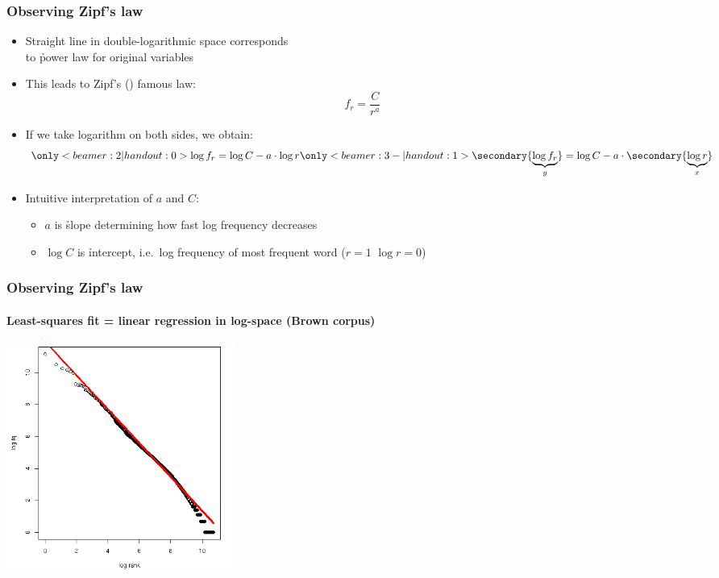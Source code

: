 \documentclass[handout,notes=show,t]{beamer} %
\begin{document}
\begin{frame}
  \frametitle{Observing Zipf's law}

  \begin{itemize}
  \item Straight line in double-logarithmic space corresponds\\
    to \h{power law} for original variables
  \item This leads to Zipf's (\citeyear{Zipf:49,Zipf:65}) famous law:
    \[
      f_r = \frac{C}{r^a}
    \]
  \item<2-> If we take logarithm on both sides, we obtain:
    \[
    \only<beamer:2| handout:0>{%
      \log f_r = \log C - a \cdot \log r}%
    \only<beamer:3-| handout:1>{%
      \secondary{\underbrace{\log f_r}_y}
      = \log C - a \cdot \secondary{\underbrace{\log r}_x}}%
    \]
  \item<4-> Intuitive interpretation of $a$ and $C$:
    \begin{itemize}
    \item $a$ is \h{slope} determining how fast log frequency decreases
    \item $\log C$ is \h{intercept}, i.e.\ log frequency of most frequent word
      ($r = 1$ \so $\log r = 0$) 
    \end{itemize}
  \end{itemize}

\end{frame}

\begin{frame}
  \frametitle{Observing Zipf's law}
  \framesubtitle{Least-squares fit = linear regression in log-space (Brown corpus)}

  \ungap[1.5]
  \begin{center}
    \includegraphics[height=7.5cm]{img/brown-zipf-rf}
  \end{center}
\end{frame}
\end{document}
